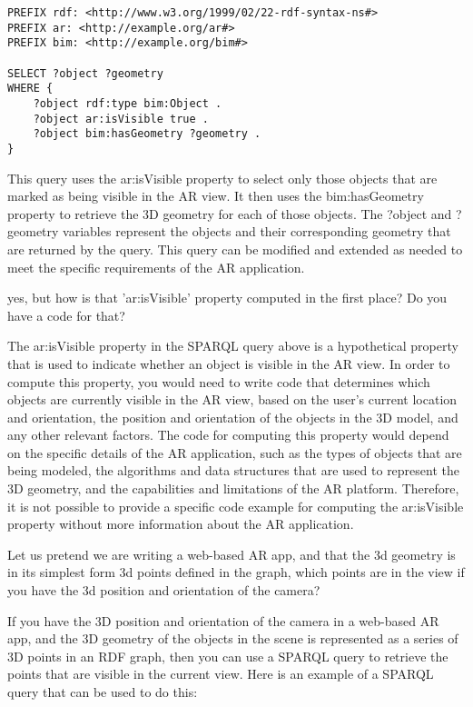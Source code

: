 \begin{description}
	\begin{lstlisting}[language=SPARQL]
PREFIX rdf: <http://www.w3.org/1999/02/22-rdf-syntax-ns#>
PREFIX ar: <http://example.org/ar#>
PREFIX bim: <http://example.org/bim#>

SELECT ?object ?geometry
WHERE {
    ?object rdf:type bim:Object .
    ?object ar:isVisible true .
    ?object bim:hasGeometry ?geometry .
}
\end{lstlisting}

	This query uses the ar:isVisible property to select only those objects that are marked as being visible in the AR view. It then uses the bim:hasGeometry property to retrieve the 3D geometry for each of those objects. The ?object and ?geometry variables represent the objects and their corresponding geometry that are returned by the query. This query can be modified and extended as needed to meet the specific requirements of the AR application.

	\me yes, but how is that 'ar:isVisible' property computed in the first place? Do you have a code for that?

	\gpt The ar:isVisible property in the SPARQL query above is a hypothetical property that is used to indicate whether an object is visible in the AR view. In order to compute this property, you would need to write code that determines which objects are currently visible in the AR view, based on the user's current location and orientation, the position and orientation of the objects in the 3D model, and any other relevant factors. The code for computing this property would depend on the specific details of the AR application, such as the types of objects that are being modeled, the algorithms and data structures that are used to represent the 3D geometry, and the capabilities and limitations of the AR platform. Therefore, it is not possible to provide a specific code example for computing the ar:isVisible property without more information about the AR application.

	\me Let us pretend we are writing a web-based AR app, and that the 3d geometry is in its simplest form 3d points defined in the graph, which points are in the view if you have the 3d position and orientation of the camera?

	\gpt If you have the 3D position and orientation of the camera in a web-based AR app, and the 3D geometry of the objects in the scene is represented as a series of 3D points in an RDF graph, then you can use a SPARQL query to retrieve the points that are visible in the current view. Here is an example of a SPARQL query that can be used to do this:


\end{description}
